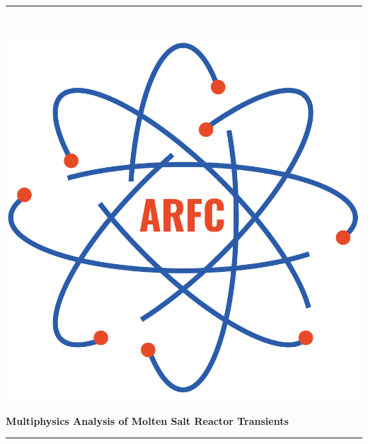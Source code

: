 \begin{titlepage} %
    \newcommand{\HRule}{\rule{\linewidth}{0.5mm}} %
    
    \center %

    
    \HRule\\[0.2cm]
    
     \begin{minipage}{0.4\textwidth}
        \includegraphics[width=\textwidth]{arfc-logo}
        \end{minipage}%
        \begin{minipage}{0.6\textwidth}
        {\begin{flushright}\huge\bfseries Multiphysics Analysis of Molten Salt Reactor Transients\end{flushright}}
        \end{minipage}

    \vspace{0.2cm}
    \HRule
    \vspace{0.5cm}
    

\end{titlepage}
